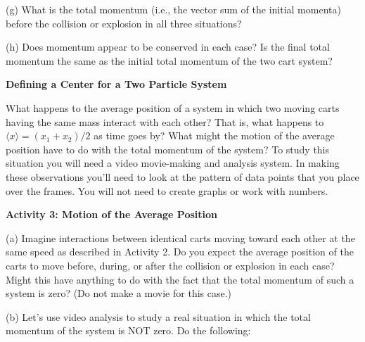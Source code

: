(g) What is the total momentum (i.e., the vector sum of the initial momenta)
before the collision or explosion in all three situations?
\vspace{20mm}

(h) Does momentum appear to be conserved in each case? Is the final total momentum
the same as the initial total momentum of the two cart system?
\vspace{20mm}

\textbf{Defining a Center for a Two Particle System }

What happens to the average position of a system in which two moving carts having
the same mass interact with each other? That is, what happens to 
\(\langle x\rangle = (x_{1} 
+ x_{2} )/2\) as time goes by? What might the motion of the average position
have to do with the total momentum of the system? To study this situation you
will need a video movie-making and analysis system. In making these observations
you'll need to look at the pattern of data points that you place over the frames.
You will not need to create graphs or work with numbers. 

\textbf{Activity 3: Motion of the Average Position} 

(a) Imagine interactions between identical carts moving toward each other at
the same speed as described in Activity 2. Do you expect the average position
of the carts to move before, during, or after the collision or explosion in
each case? Might this have anything to do with the fact that the total momentum
of such a system is zero? (Do not make a movie for this case.)
\vspace{20mm}

(b) Let's use video analysis to study a real situation in which the total momentum of the system is NOT zero. Do the following: 

